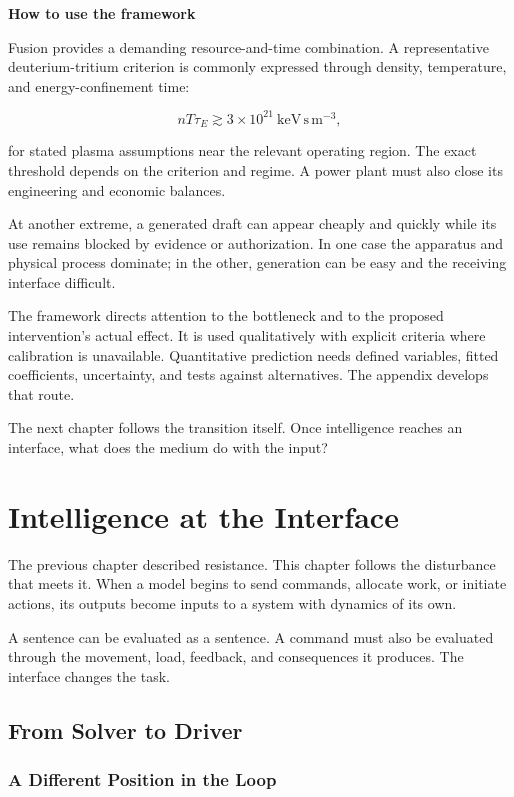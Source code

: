 \documentclass[11pt,openany]{book}
\newcommand{\subhead}[1]{\par\medskip\noindent\textbf{#1}\par\nobreak\smallskip}
\begin{document}
\subhead{How to use the framework}

Fusion provides a demanding resource-and-time combination. A representative deuterium-tritium criterion is commonly expressed through density, temperature, and energy-confinement time:

\begin{equation}
nT\tau_E\gtrsim
3\times10^{21}\ \mathrm{keV\,s\,m^{-3}},
\end{equation}

for stated plasma assumptions near the relevant operating region.\cite{lawson1957some} The exact threshold depends on the criterion and regime. A power plant must also close its engineering and economic balances.

At another extreme, a generated draft can appear cheaply and quickly while its use remains blocked by evidence or authorization. In one case the apparatus and physical process dominate; in the other, generation can be easy and the receiving interface difficult.

The framework directs attention to the bottleneck and to the proposed intervention's actual effect. It is used qualitatively with explicit criteria where calibration is unavailable. Quantitative prediction needs defined variables, fitted coefficients, uncertainty, and tests against alternatives. The appendix develops that route.

The next chapter follows the transition itself. Once intelligence reaches an interface, what does the medium do with the input?

\chapter{Intelligence at the Interface}

The previous chapter described resistance. This chapter follows the disturbance that meets it. When a model begins to send commands, allocate work, or initiate actions, its outputs become inputs to a system with dynamics of its own.

A sentence can be evaluated as a sentence. A command must also be evaluated through the movement, load, feedback, and consequences it produces. The interface changes the task.

\section{From Solver to Driver}

\subsection{A Different Position in the Loop}
\end{document}
